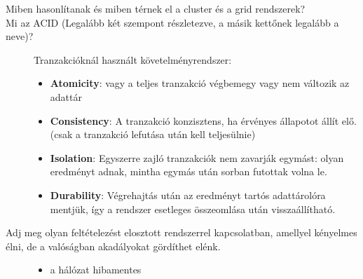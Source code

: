 \documentclass[twoside, a4paper, 12pt]{article}
\begin{document}
\begin{description}
\begin{itemize}
\begin{itemize}
                    \end{itemize}
            \end{itemize}
        \item[Miben hasonlítanak és miben térnek el a cluster és a grid
            rendszerek?]
            \hfill
        \item[Mi az ACID (Legalább két szempont részletezve, a másik kettőnek legalább a neve)?]
            \hfill
            Tranzakcióknál használt követelményrendszer:
            \begin{itemize}
                \item \textbf{Atomicity}: vagy a teljes tranzakció végbemegy vagy nem változik az adattár
                \item \textbf{Consistency}: A tranzakció konzisztens, ha érvényes állapotot állít elő. (csak a tranzakció lefutása után kell teljesülnie)
                \item \textbf{Isolation}: Egyszerre zajló tranzakciók nem zavarják egymást: olyan eredményt adnak, mintha egymás után sorban futottak volna le.
                \item \textbf{Durability}: Végrehajtás után az eredményt tartós adattárolóra mentjük, így a rendszer esetleges összeomlása után visszaállítható.
            \end{itemize}
        \item[Adj meg olyan feltételezést elosztott rendszerrel kapcsolatban, amellyel kényelmes élni, de a valóságban akadályokat gördíthet elénk.]
            \hfill
            \begin{itemize}
                \item a hálózat hibamentes

\end{itemize}
\end{description}
\end{document}
